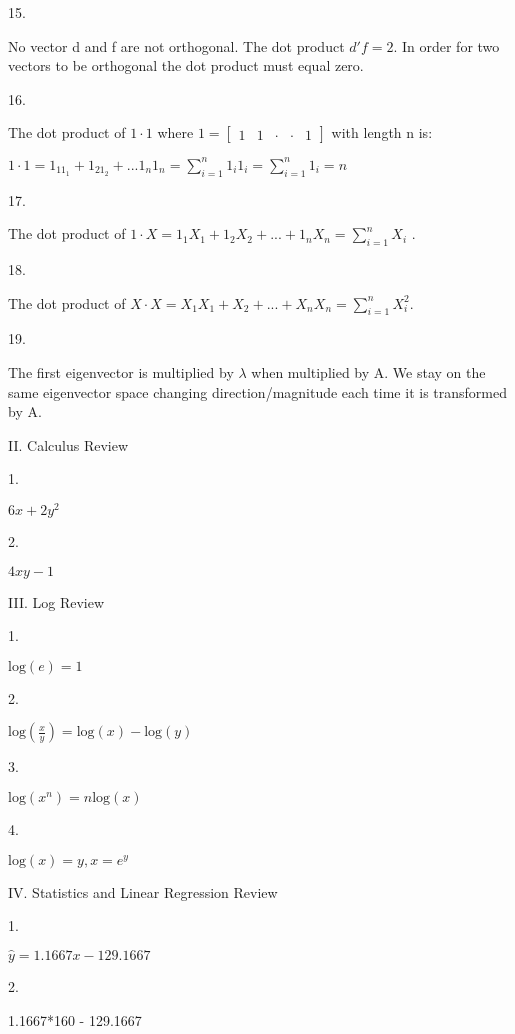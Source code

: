 \documentclass[
  letterpaper,
  DIV=11,
  numbers=noendperiod]{scrartcl}
\newenvironment{Shaded}{\begin{snugshade}}{\end{snugshade}}
\newcommand{\DecValTok}[1]{\textcolor[rgb]{0.68,0.00,0.00}{#1}}
\newcommand{\FloatTok}[1]{\textcolor[rgb]{0.68,0.00,0.00}{#1}}
\newcommand{\SpecialCharTok}[1]{\textcolor[rgb]{0.37,0.37,0.37}{#1}}
\begin{document}
15.

No vector d and f are not orthogonal. The dot product \(d'f=2\). In
order for two vectors to be orthogonal the dot product must equal zero.

16.

The dot product of \(1 \cdot 1\) where
\(1 = \begin{bmatrix} 1 & 1 & \cdot & \cdot & 1\end{bmatrix}\) with
length n is:

\(1 \cdot 1=1_11_1+1_21_2+...1_n1_n=\sum_{i=1}^n1_i1_i=\sum_{i=1}^n1_i=n\)

17.

The dot product of
\(1 \cdot X=1_1X_1+1_2X_2+...+1_nX_n=\sum_{i=1}^nX_i\) .

18.

The dot product of
\(X \cdot X=X_1X_1+X_2+...+X_nX_n=\sum_{i=1}^nX_i^2\).

19.

The first eigenvector is multiplied by \(\lambda\) when multiplied by A.
We stay on the same eigenvector space changing direction/magnitude each
time it is transformed by A.

II. Calculus Review

1.

\(6x +2y^2\)

2.

\(4xy -1\)

III. Log Review

1.

\(\text{log}(e)=1\)

2.

\(\text{log}(\frac{x}{y})=\text{log}(x)-\text{log}(y)\)

3.

\(\text{log}(x^n)=n\text{log}(x)\)

4.

\(\text{log}(x)=y,x=e^y\)

IV. Statistics and Linear Regression Review

1.

\(\hat{y}=1.1667x-129.1667\)

2.

\begin{Shaded}
\begin{Highlighting}[]
\FloatTok{1.1667}\SpecialCharTok{*}\DecValTok{160} \SpecialCharTok{{-}} \FloatTok{129.1667}
\end{Highlighting}
\end{Shaded}
\end{document}
